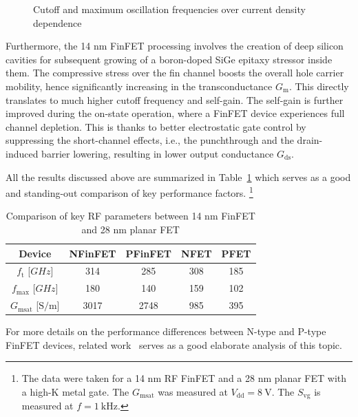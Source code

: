 \documentclass[11pt,a4paper]{article}
\begin{document}
\begin{figure}[!ht]
\begin{subfigure}{.45\textwidth}
            \end{subfigure}
            \caption{\label{fig:performance-frequencies}Cutoff and maximum oscillation frequencies over current density dependence}
        \end{figure}

        Furthermore, the 14 nm FinFET processing involves the creation of deep silicon cavities for subsequent growing of a boron-doped SiGe epitaxy stressor inside them. The compressive stress over the fin channel boosts the overall hole carrier mobility, hence significantly increasing in the transconductance $G_{\mathrm{m}}$. This directly translates to much higher cutoff frequency and self-gain. The self-gain is further improved during the on-state operation, where a FinFET device experiences full channel depletion. This is thanks to better electrostatic gate control by suppressing the short-channel effects, i.e., the punchthrough and the drain-induced barrier lowering, resulting in lower output conductance $G_{\mathrm{ds}}$.
        
        All the results discussed above are summarized in Table~\ref{table:rf-parameters-comparison} which serves as a good and standing-out comparison of key performance factors.%
            \footnote{The data were taken for a 14 nm RF FinFET and a 28 nm planar FET with a high-K metal gate. The $G_{\mathrm{msat}}$ was measured at $V_{\mathrm{dd}} = \qty{8}{\volt}$. The $S_{\mathrm{vg}}$ is measured at $f = \qty{1}{\kHz}$.}
        \begin{table}[!ht]
            \centering
            \begin{tabular}{|c|c|c|c|c|}
                \hline
                Device & NFinFET & PFinFET & NFET & PFET\\
                \hline\hline
                $f_{\mathrm{t}}$ [$\unit{GHz}$] & 314 & 285 & 308 & 185\\
                \hline
                $f_{\mathrm{max}}$ [$\unit{GHz}$] & 180 & 140 & 159 & 102\\
                \hline
                $G_{\mathrm{msat}}$ [$\unit{\siemens\per\meter}$] & 3017 & 2748 & 985 & 395\\
                \hline
            \end{tabular}
            \caption{\label{table:rf-parameters-comparison}Comparison of key RF parameters between 14 nm FinFET and 28 nm planar FET}
        \end{table}

        For more details on the performance differences between N-type and P-type FinFET devices, related work~\cite{zhang-niu-cai-imura:pmos-nmos-14nm-finfet-comparison} serves as a good elaborate analysis of this topic.
\end{document}
